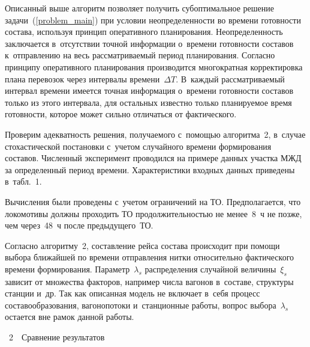 \begin{multicols}{2}
{}



Описанный выше алгоритм позволяет получить субоптимальное 
решение задачи~(\ref{problem_main}) при условии неопределенности
во времени готовности состава, используя принцип оперативного планирования. 
Неопределенность заключается в~отсутствии точной информации 
о~времени готовности составов к~отправлению на весь рассматриваемый период 
планирования. Согласно принципу оперативного планирования производится 
многократная корректировка плана перевозок через интервалы времени~$\Delta T$. 
В~каждый рассматриваемый интервал времени имеется точная информация 
о~времени готовности составов только из этого интервала, для остальных 
известно только планируемое время готовности, которое может сильно отличаться 
от фактического.

Проверим адекватность решения, получаемого с~помощью алгоритма~2, 
в~случае стохастической постановки
с~учетом случайного времени формирования составов. Численный эксперимент проводился 
на примере данных участка МЖД за определенный период 
времени. Характеристики входных данных приведены в~табл.~1.



Вычисления были проведены с~учетом ограничений на ТО. Предполагается, 
что локомотивы должны проходить ТО продолжительностью
не менее~8~ч не позже, чем через~48~ч после предыду\-ще\-го~ТО.








Согласно алгоритму~2, составление рейса состава происходит при помощи выбора 
ближайшей по времени отправления
нитки относительно фактического времени формирования.
Параметр~$\lambda_s$ распределения случайной величины~$\xi_s$ зависит 
от множества факторов, например числа вагонов в~составе,
структуры станции и~др. Так как описанная модель не включает в~себя 
процесс составообразования,
вагонопотоки и~станционные работы, вопрос выбора~$\lambda_s$ остается вне 
рамок данной работы.\linebreak\vspace*{-12pt}


\columnbreak

{\small %
    \begin{center}
    {{\tablename~2}\ \ \small{Сравнение результатов}}
    

\end{center}}
\end{multicols}
